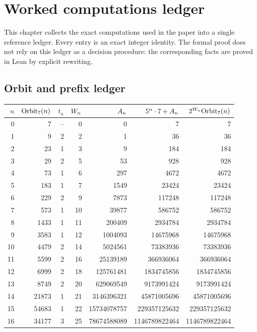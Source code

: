\section{Worked computations ledger}

This chapter collects the exact computations used in the paper into a
single reference ledger.  Every entry is an exact integer identity.
The formal proof does not rely on this ledger as a decision procedure:
the corresponding facts are proved in Lean by explicit rewriting.

\subsection{Orbit and prefix ledger}

\begin{center}
\scriptsize
\begin{tabular}{@{}rrrrrrr@{}}
\toprule
$n$ & $\mathrm{Orbit}_7(n)$ & $t_n$ & $W_n$ & $A_n$ &
  $5^n\cdot7+A_n$ & $2^{W_n}\mathrm{Orbit}_7(n)$ \\
\midrule
0 & 7 & -- & 0 & 0 & 7 & 7 \\
1 & 9 & 2 & 2 & 1 & 36 & 36 \\
2 & 23 & 1 & 3 & 9 & 184 & 184 \\
3 & 29 & 2 & 5 & 53 & 928 & 928 \\
4 & 73 & 1 & 6 & 297 & 4672 & 4672 \\
5 & 183 & 1 & 7 & 1549 & 23424 & 23424 \\
6 & 229 & 2 & 9 & 7873 & 117248 & 117248 \\
7 & 573 & 1 & 10 & 39877 & 586752 & 586752 \\
8 & 1433 & 1 & 11 & 200409 & 2934784 & 2934784 \\
9 & 3583 & 1 & 12 & 1004093 & 14675968 & 14675968 \\
10 & 4479 & 2 & 14 & 5024561 & 73383936 & 73383936 \\
11 & 5599 & 2 & 16 & 25139189 & 366936064 & 366936064 \\
12 & 6999 & 2 & 18 & 125761481 & 1834745856 & 1834745856 \\
13 & 8749 & 2 & 20 & 629069549 & 9173991424 & 9173991424 \\
14 & 21873 & 1 & 21 & 3146396321 & 45871005696 & 45871005696 \\
15 & 54683 & 1 & 22 & 15734078757 & 229357125632 & 229357125632 \\
16 & 34177 & 3 & 25 & 78674588089 & 1146789822464 & 1146789822464 \\
\bottomrule
\end{tabular}
\end{center}

